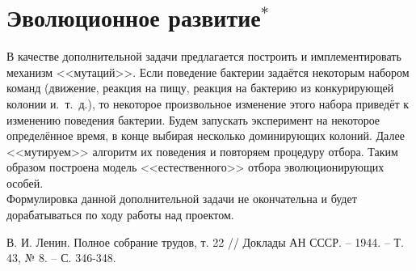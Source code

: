 \documentclass[11pt,twoside,twocolumn,russian,a4paper]{article}
\begin{document}
\section{Эволюционное развитие$^*$}
\noindent В качестве дополнительной задачи предлагается построить и имплементировать механизм <<мутаций>>. Если поведение бактерии задаётся некоторым набором команд (движение, реакция на пищу, реакция на бактерию из конкурирующей колонии и.~т.~д.), то некоторое произвольное изменение этого набора приведёт к изменению поведения бактерии. Будем запускать эксперимент на некоторое определённое время, в конце выбирая несколько доминирующих колоний. Далее <<мутируем>> алгоритм их поведения и повторяем процедуру отбора. Таким образом построена модель <<естественного>> отбора эволюционирующих особей.\smallskip\\
\noindent Формулировка данной дополнительной задачи не окончательна и будет дорабатываться по ходу работы над проектом.



\begin{thebibliography}{99}

 В. И. Ленин.  Полное собрание трудов, т. 22 // Доклады АН СССР. -- 1944. -- Т. 43, № 8. -- С. 346-348.
 
\end{thebibliography}

\end{document}
